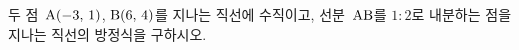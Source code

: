 두 점~$\mathrm{A}(-3,\,1)$, $\mathrm{B}(6,\,4)$를 지나는 직선에 수직이고, 선분~$\mathrm{AB}$를 $1:2$로 내분하는 점을 지나는 직선의 방정식을 구하시오.
